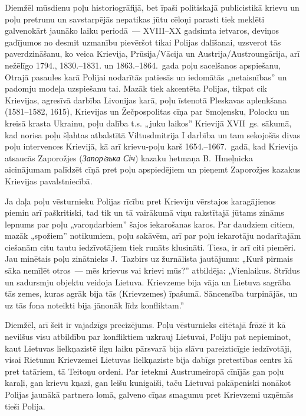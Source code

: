 \documentclass[twoside,a5paper,12pt,fleqn,openany]{extbook}
\newcommand{\uktxti}[1]{\textit{\textukrainian{#1}}}
\begin{document}
Diemžēl mūsdienu poļu historiogrāfijā, bet īpaši politiskajā publicistikā krievu un poļu pretrunu un savstarpējās nepatikas jūtu cēloņi parasti tiek meklēti galvenokārt jaunāko laiku periodā~--- XVIII--XX gadsimta ietvaros, deviņos gadījumos no desmit uzmanību pievēršot tikai Polijas dalīšanai, uzsverot tās paverdzināšanu, ko veica Krievija, Prūsija/Vācija un Austrija/Austroungārija, arī nežēlīgo 1794., 1830.--1831. un 1863.--1864.~gada poļu sacelšanos apspiešanu, Otrajā pasaules karā Polijai nodarītās patiesās un iedomātās „netaisnības” un padomju modeļa uzspiešanu tai. Mazāk tiek akcentēta Polijas, tikpat cik Krievijas, agresīvā darbība Livonijas karā, poļu īstenotā Pleskavas aplenkšana (1581--1582, 1615), Krievijas un Žečpospolitas cīņa par Smoļensku, Polocku un kreisā krasta Ukrainu, poļu dalība t.s. „juku laikos” Krievijā XVII~gs. sākumā, kad norisa poļu šļahtas atbalstītā Viltusdmitrija I darbība un tam sekojošās divas poļu intervences Krievijā, kā arī krievu-poļu karš 1654.--1667.~gadā, kad Krievija atsaucās Zaporožjes (\uktxti{Запорiзька Січ}) kazaku hetmaņa B.~Hmeļnicka aicinājumam palīdzēt cīņā pret poļu apspiedējiem un pieņemt Zaporožjes kazakus Krievijas pavalstniecībā.

Ja daļa poļu vēsturnieku Polijas rīcību pret Krieviju vērstajos karagājienos piemin arī paškritiski, tad tik un tā vairākumā viņu rakstītajā jūtams zināms lepnums par poļu „varoņdarbiem” šajos iekarošanas karos. Par daudziem citiem, mazāk „spožiem” notikumiem, poļu sakāvēm, arī par poļu iekarotāju nodarītajām ciešanām citu tautu iedzīvotājiem tiek runāts klusināti. Tiesa, ir arī citi piemēri. Jau minētais poļu zinātnieks J.~Tazbirs uz žurnālista jautājumu: „Kurš pirmais sāka nemīlēt otros~--- mēs krievus vai krievi mūs?” atbildēja: „Vienlaikus. Strīdus un sadursmju objektu veidoja Lietuva. Krievzeme bija vāja un Lietuva sagrāba tās zemes, kuras agrāk bija tās (Krievzemes) īpašumā. Sāncensība turpinājās, un uz tās fona noteikti bija jānonāk līdz konfliktam.”

Diemžēl, arī šeit ir vajadzīgs precizējums. Poļu vēsturnieks citētajā frāzē it kā nevilšus visu atbildību par konfliktiem uzkrauj Lietuvai, Poliju pat nepieminot, kaut Lietuvas lielkņazistē ilgu laiku pārsvarā bija slāvu pareizticīgie iedzīvotāji, visai Rietumu Krievzemei Lietuvas lielkņaziste bija dabīgs pretestības centrs kā pret tatāriem, tā Teitoņu ordeni. Par ietekmi Austrumeiropā cīnījās gan poļu karaļi, gan krievu kņazi, gan leišu kunigaiši, taču Lietuvai pakāpeniski nonākot Polijas jaunākā partnera lomā, galveno cīņas smagumu pret Krievzemi uzņēmās tieši Polija.
\end{document}

